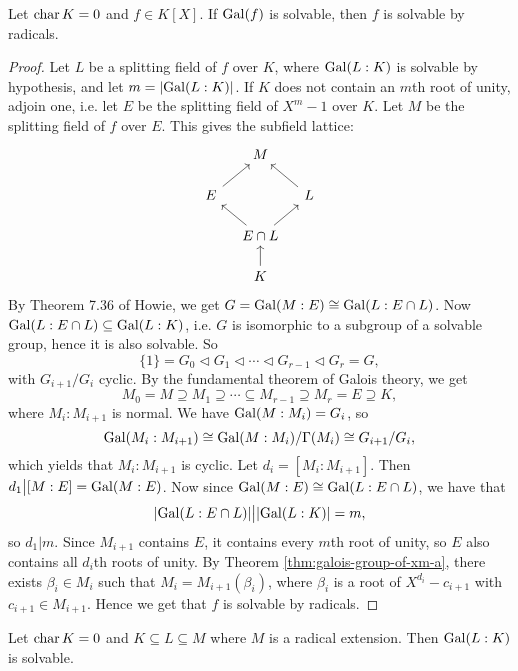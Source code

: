 \begin{theorem}
  Let $\operatorname{char} K = 0$ and $f \in K[X]$. If
  $\operatorname{Gal}(f)$ is solvable, then $f$ is solvable
  by radicals.
\end{theorem}

\begin{proof}
  Let $L$ be a splitting field of $f$ over $K$, where
  $\operatorname{Gal}(L : K)$ is solvable by hypothesis, and let
  $m = |{\operatorname{Gal}(L : K)}|$. If $K$ does not contain an
  $m$th root of unity, adjoin one, i.e. let $E$ be the
  splitting field of $X^m - 1$ over $K$. Let $M$ be
  the splitting field of $f$ over $E$. This gives the
  subfield lattice:
  \[
    \begin{tikzcd}[column sep=1em, row sep=1.5em]
      & M \\
      E & & L \\
        & E \cap L \\
        & K
      \arrow[from=2-1, to=1-2]
      \arrow[from=2-3, to=1-2]
      \arrow[from=3-2, to=2-1]
      \arrow[from=3-2, to=2-3]
      \arrow[from=4-2, to=3-2]
    \end{tikzcd}
  \]
  By Theorem 7.36 of Howie, we get
  $G = \operatorname{Gal}(M : E) \cong \operatorname{Gal}(L : E \cap L)$. Now
  $\operatorname{Gal}(L : E \cap L) \subseteq \operatorname{Gal}(L : K)$, i.e. $G$
  is isomorphic to a subgroup of a solvable group, hence
  it is also solvable. So
  \[
    \{1\} = G_0 \triangleleft G_1 \triangleleft \cdots \triangleleft G_{r - 1} \triangleleft G_r = G,
  \]
  with $G_{i + 1} / G_i$ cyclic. By the fundamental
  theorem of Galois theory, we get
  \[
    M_0 = M \supseteq M_1 \supseteq \cdots \subseteq M_{r - 1} \supseteq M_r = E \supseteq K,
  \]
  where $M_i : M_{i + 1}$ is normal. We have
  $\operatorname{Gal}(M : M_i) = G_i$, so
  \[
    \operatorname{Gal}(M_i : M_{i + 1}) \cong \operatorname{Gal}(M : M_i) / \Gamma(M_i)
    \cong G_{i + 1} / G_i,
  \]
  which yields that $M_i : M_{i + 1}$ is cyclic.
  Let $d_i = [M_i : M_{i + 1}]$. Then
  $d_1 \big| [M : E] = \operatorname{Gal}(M : E)$. Now since
  $\operatorname{Gal}(M : E) \cong \operatorname{Gal}(L : E \cap L)$, we have that
  \[
    |{\operatorname{Gal}(L : E \cap L)}| \big| |{\operatorname{Gal}(L : K)}| = m,
  \]
  so $d_1 | m$. Since $M_{i + 1}$ contains $E$, it
  contains every $m$th root of unity, so $E$ also contains
  all $d_i$th roots of unity. By Theorem
  \ref{thm:galois-group-of-xm-a}, there exists
  $\beta_i \in M_i$ such that $M_i = M_{i + 1}(\beta_i)$,
  where $\beta_i$ is a root of $X^{d_i} - c_{i + 1}$ with
  $c_{i + 1} \in M_{i + 1}$. Hence we get that
  $f$ is solvable by radicals.
\end{proof}

\begin{theorem}
  Let $\operatorname{char} K = 0$ and $K \subseteq L \subseteq M$ where
  $M$ is a radical extension. Then $\operatorname{Gal}(L : K)$ is
  solvable.
\end{theorem}


